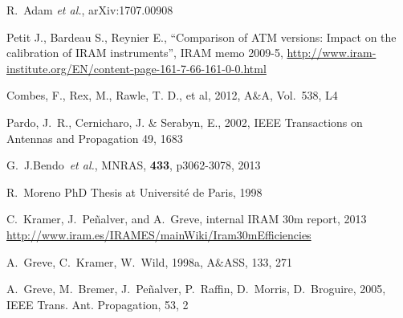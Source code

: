 
\begin{thebibliography}{99}
  
 R.~Adam {\it et al.}, arXiv:1707.00908
  
Petit J., Bardeau S., Reynier E., ``Comparison of ATM versions: Impact
on the calibration of IRAM instruments'', IRAM memo 2009-5,
\url{http://www.iram-institute.org/EN/content-page-161-7-66-161-0-0.html}

 Combes, F., Rex, M., Rawle, T. D., et al, 2012, A\&A,
  Vol.~538, L4

  Pardo, J.~R., Cernicharo, J. $\&$ Serabyn, E.,
  2002, IEEE Transactions on Antennas and Propagation 49, 1683


  
  G.~J.Bendo~{\it et al.}, MNRAS, {\bf 433}, p{3062-3078}, 2013 

R.~Moreno PhD Thesis at
Universit\'e de Paris, 1998
  
  C.~Kramer, J.~Pe\~nalver, and A.~Greve, internal IRAM 30m report,
  2013
  \url{http://www.iram.es/IRAMES/mainWiki/Iram30mEfficiencies}

A.~Greve, C.~Kramer, W.~Wild, 1998a, A$\&$ASS, 133, 271

A.~Greve, M.~Bremer, J.~Pe\~nalver, P.~Raffin, D.~Morris, D.~Broguire,
2005, IEEE Trans. Ant. Propagation, 53, 2
  

\end{thebibliography}
